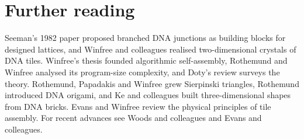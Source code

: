 \section*{Further reading}
Seeman's 1982 paper proposed branched DNA junctions as building blocks for
designed lattices,\cite{Seeman1982} and Winfree and colleagues realised
two-dimensional crystals of DNA tiles.\cite{Winfree1998} Winfree's thesis
founded algorithmic self-assembly,\cite{Winfree1998thesis} Rothemund and Winfree
analysed its program-size complexity,\cite{RothemundWinfree2000} and Doty's
review surveys the theory.\cite{Doty2012} Rothemund, Papadakis and Winfree grew
Sierpinski triangles,\cite{Rothemund2004} Rothemund introduced DNA
origami,\cite{Rothemund2006} and Ke and colleagues built three-dimensional shapes
from DNA bricks.\cite{Ke2012} Evans and Winfree review the physical principles of
tile assembly.\cite{EvansWinfree2017} For recent advances see Woods and
colleagues\cite{Woods2019} and Evans and colleagues.\cite{Evans2024}
